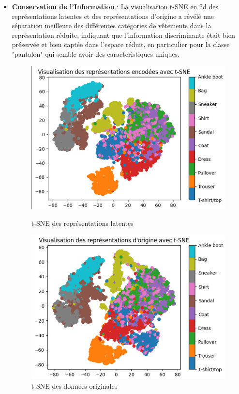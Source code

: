 \documentclass[unnumsec,webpdf,modern,large]{projet_manifold}%
\theoremstyle{thmstyleone}%
\theoremstyle{thmstyletwo}%
\theoremstyle{thmstylethree}%
\begin{document}
\begin{itemize}
    \item \textbf{Conservation de l'Information} : La visualisation t-SNE en 2d des représentations latentes et des représentations d'origine a révélé une séparation meilleure des différentes catégories de vêtements dans la représentation réduite, indiquant que l'information discriminante était bien préservée et bien captée dans l'espace réduit, en particulier pour la classe "pantalon" qui semble avoir des caractéristiques uniques.
    \begin{figure}[H]
        \centering
        \begin{minipage}[b]{0.45\columnwidth}
            \centering
            \includegraphics[width=\columnwidth]{Fig/tsnee_latent.png}
            \caption{t-SNE des représentations latentes}
            \label{fig:tsnee_latent}
        \end{minipage}
        \hspace{0.05\columnwidth}
        \begin{minipage}[b]{0.45\columnwidth}
            \centering
            \includegraphics[width=\columnwidth]{Fig/tsnee_origine.png}
            \caption{t-SNE des données originales}
            \label{fig:tsnee_origine}
        \end{minipage}
    \end{figure}
    

\end{itemize}
\end{document}
